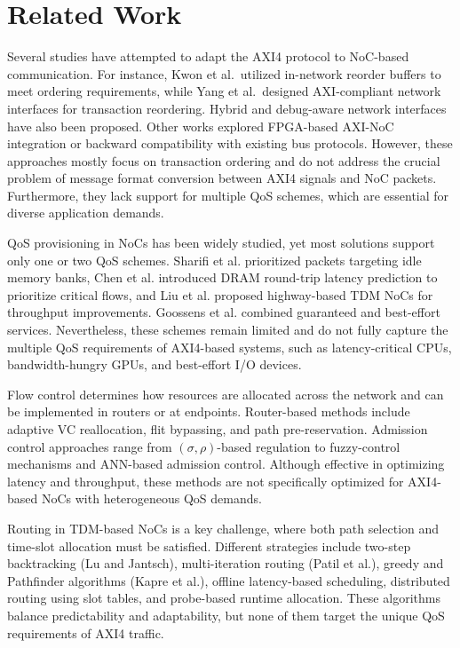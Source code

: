 \section{Related Work}

Several studies have attempted to adapt the AXI4 protocol to NoC-based communication. For instance, Kwon et al.\ utilized in-network reorder buffers to meet ordering requirements, while Yang et al.\ designed AXI-compliant network interfaces for transaction reordering. Hybrid and debug-aware network interfaces have also been proposed. 
Other works explored FPGA-based AXI-NoC integration or backward compatibility with existing bus protocols. However, these approaches mostly focus on transaction ordering and do not address the crucial problem of message format conversion between AXI4 signals and NoC packets. Furthermore, they lack support for multiple QoS schemes, which are essential for diverse application demands. 

QoS provisioning in NoCs has been widely studied, yet most solutions 
support only one or two QoS schemes. Sharifi et al. prioritized packets targeting idle memory banks, Chen et al. introduced DRAM round-trip latency prediction to prioritize critical flows, and Liu et al. proposed highway-based TDM NoCs for throughput improvements. Goossens et al. combined guaranteed and best-effort services. Nevertheless, these schemes remain limited and do not fully capture the multiple QoS requirements of AXI4-based systems, such as latency-critical CPUs, bandwidth-hungry GPUs, and best-effort I/O devices. 

Flow control determines how resources are allocated across the network and can be implemented in routers or at endpoints. Router-based methods include adaptive VC reallocation, flit bypassing, and path pre-reservation. Admission control approaches range from $(\sigma,\rho)$-based regulation to fuzzy-control mechanisms and ANN-based admission control. Although effective in optimizing latency and throughput, these methods are not specifically optimized for AXI4-based NoCs with heterogeneous QoS demands. 

Routing in TDM-based NoCs is a key challenge, where both path selection and time-slot allocation must be satisfied. Different strategies include two-step backtracking (Lu and Jantsch), multi-iteration routing (Patil et al.), greedy and Pathfinder algorithms (Kapre et al.), offline latency-based scheduling, distributed routing using slot tables, and probe-based runtime allocation. These algorithms balance predictability and adaptability, but none of them target the unique QoS requirements of AXI4 traffic. 

